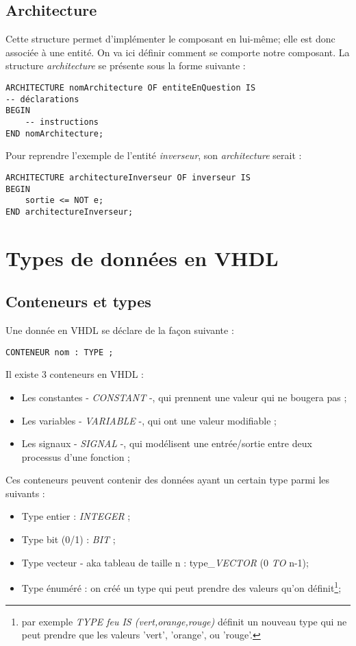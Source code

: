 \documentclass[11.5pt]{report}
\begin{document}
\subsection{Architecture}
Cette structure permet d'implémenter le composant en lui-même; elle est donc associée à une entité.
On va ici définir comment se comporte notre composant.
La structure \emph{architecture} se présente sous la forme suivante :
\begin{verbatim}
ARCHITECTURE nomArchitecture OF entiteEnQuestion IS
-- déclarations
BEGIN
	-- instructions
END nomArchitecture;
\end{verbatim}
Pour reprendre l'exemple de l'entité \emph{inverseur}, son \emph{architecture} serait :
\begin{verbatim}
ARCHITECTURE architectureInverseur OF inverseur IS
BEGIN
	sortie <= NOT e;
END architectureInverseur;
\end{verbatim}

\section{Types de données en VHDL}
\subsection{Conteneurs et types}
Une donnée en VHDL se déclare de la façon suivante :
\begin{verbatim}
CONTENEUR nom : TYPE ;
\end{verbatim}
Il existe 3 conteneurs en VHDL :
\begin{itemize}
\item{Les constantes - \emph{CONSTANT} -, qui prennent une valeur qui ne bougera pas ;}
\item{Les variables - \emph{VARIABLE} -, qui ont une valeur modifiable ;}
\item{Les signaux - \emph{SIGNAL} -, qui modélisent une entrée/sortie entre deux processus d'une fonction ;}
\end{itemize}
Ces conteneurs peuvent contenir des données ayant un certain type parmi les suivants :
\begin{itemize}
\item{Type entier : \emph{INTEGER} ;}
\item{Type bit (0/1) : \emph{BIT} ;}
\item{Type vecteur - aka tableau de taille n : type\emph{\_VECTOR} (0 \emph{TO} n-1);}
\item{Type énuméré : on créé un type qui peut prendre des valeurs qu'on définit\footnote{par exemple \emph{TYPE feu IS (vert,orange,rouge)} définit un nouveau type qui ne peut prendre que les valeurs 'vert', 'orange', ou 'rouge'.};}
\end{itemize}
\end{document}
